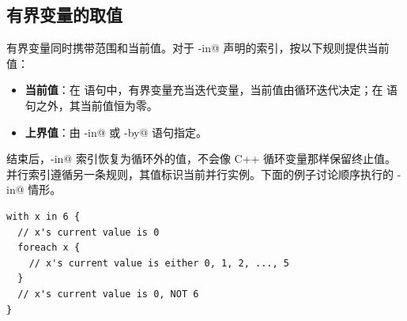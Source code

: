 \subsection*{有界变量的取值}

有界变量同时携带范围和当前值。对于 \co@with-in@ 声明的索引，\co@foreach@ 按以下规则提供当前值：

\begin{itemize}[leftmargin=1.6em]
\item \textbf{当前值}：在 \co@foreach@ 语句中，有界变量充当迭代变量，当前值由循环迭代决定；在 \co@foreach@ 语句之外，其当前值恒为零。
\end{itemize}

\begin{itemize}[leftmargin=1.6em]
\item \textbf{上界值}：由 \co@with-in@ 或 \co@parallel-by@ 语句指定。
\end{itemize}

\co@foreach@ 结束后，\co@with-in@ 索引恢复为循环外的值，不会像 C++ 循环变量那样保留终止值。并行索引遵循另一条规则，其值标识当前并行实例。下面的例子讨论顺序执行的 \co@with-in@ 情形。

\begin{lstlisting}[language=croqtile,caption={有界变量的取值}]
with x in 6 {
  // x's current value is 0
  foreach x {
    // x's current value is either 0, 1, 2, ..., 5
  }
  // x's current value is 0, NOT 6
}
\end{lstlisting}
